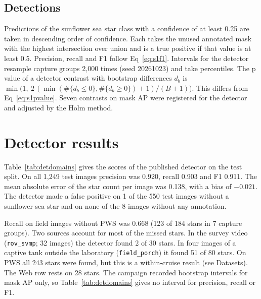 \subsection*{Detections}

Predictions of the sunflower sea star class with a confidence of at least 0.25 are taken in descending order of confidence.
Each takes the unused annotated mask with the highest intersection over union and is a true positive if that value is at least 0.5.
Precision, recall and F1 follow Eq~\ref{eq:s1f1}.
Intervals for the detector resample capture groups 2,000 times (seed 20261023) and take percentiles.
The p value of a detector contrast with bootstrap differences $d_b$ is $\min\bigl(1,\ 2\,(\min(\#\{d_b \leq 0\}, \#\{d_b \geq 0\}) + 1)/(B+1)\bigr)$.
This differs from Eq~\ref{eq:s1pvalue}.
Seven contrasts on mask AP were registered for the detector and adjusted by the Holm method.

\section*{Detector results}

Table~\ref{tab:detdomains} gives the scores of the published detector on the test split.
On all 1,249 test images precision was 0.920, recall 0.903 and F1 0.911.
The mean absolute error of the star count per image was 0.138, with a bias of $-0.021$.
The detector made a false positive on 1 of the 550 test images without a sunflower sea star and on none of the 8 images without any annotation.

Recall on field images without PWS was 0.668 (123 of 184 stars in 7 capture groups).
Two sources account for most of the missed stars.
In the survey video (\texttt{rov\_svmp}; 32 images) the detector found 2 of 30 stars. 
In four images of a captive tank outside the laboratory (\texttt{field\_porch}) it found 51 of 80 stars.
On PWS all 243 stars were found, but this is a within-cruise result (see Datasets).
The Web row rests on 28 stars.
The campaign recorded bootstrap intervals for mask AP only, so Table~\ref{tab:detdomains} gives no interval for precision, recall or F1.


